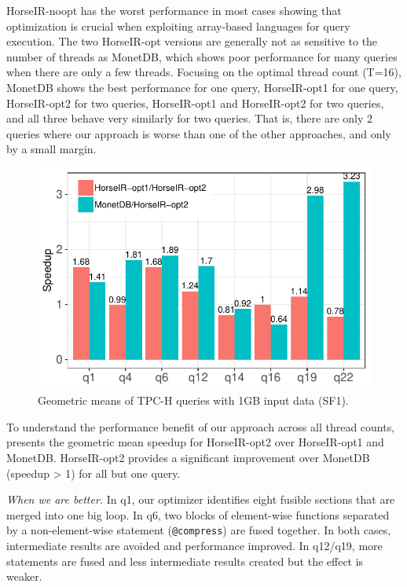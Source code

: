 HorseIR-noopt has the worst performance in most cases showing that optimization is
crucial when exploiting array-based languages for query
execution. The two HorseIR-opt versions are generally not as sensitive to the
number of threads as MonetDB, which shows poor performance for many
queries when there are only a few threads. 
Focusing on the optimal thread count (T=16), MonetDB shows the best
performance for one query, HorseIR-opt1 for one query, HorseIR-opt2 for two
queries, HorseIR-opt1 and HorseIR-opt2 for two queries, and all three behave
very similarly for two queries. That is, there are only 2 queries where our
approach is worse than one of the other approaches, and only by a small margin.

\begin{figure}[htbp]
\centering
\includegraphics[width=.86\columnwidth]{./src/figure/sf1-speedup.pdf}
\vspace{-3mm}
\caption{Geometric means of TPC-H queries with 1GB input data (SF1).}
\label{fig:tpch_sf1_speedup}
\end{figure}

To understand the performance benefit of our approach across all thread counts, 
 presents the geometric mean speedup for HorseIR-opt2
over HorseIR-opt1 and MonetDB. HorseIR-opt2 provides a significant improvement over
MonetDB (speedup > 1) for all but one query. 

\textit{When we are better.}
In q1, our optimizer identifies eight fusible sections that are merged into one
big loop. In q6, two blocks of element-wise functions separated by a non-element-wise
statement (\texttt{@compress}) are fused together. In both cases, intermediate
results are avoided and performance improved. In q12/q19, more statements
are fused and less intermediate results created but the effect is weaker.

